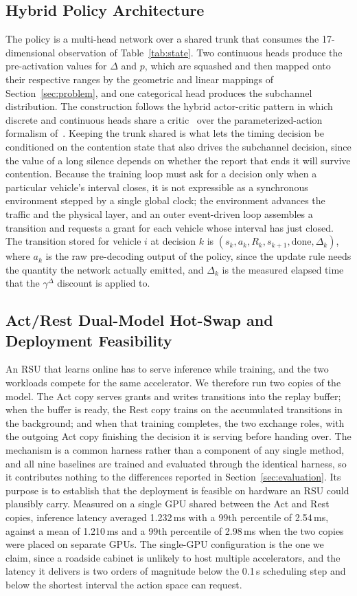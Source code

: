 \documentclass[journal]{IEEEtran}
\begin{document}
\subsection{Hybrid Policy Architecture}
The policy is a multi-head network over a shared trunk that consumes the 17-dimensional observation of Table~\ref{tab:state}. Two continuous heads produce the pre-activation values for $\Delta$ and $p$, which are squashed and then mapped onto their respective ranges by the geometric and linear mappings of Section~\ref{sec:problem}, and one categorical head produces the subchannel distribution. The construction follows the hybrid actor-critic pattern in which discrete and continuous heads share a critic~\cite{fan2019} over the parameterized-action formalism of~\cite{masson2016}. Keeping the trunk shared is what lets the timing decision be conditioned on the contention state that also drives the subchannel decision, since the value of a long silence depends on whether the report that ends it will survive contention. Because the training loop must ask for a decision only when a particular vehicle's interval closes, it is not expressible as a synchronous environment stepped by a single global clock; the environment advances the traffic and the physical layer, and an outer event-driven loop assembles a transition and requests a grant for each vehicle whose interval has just closed. The transition stored for vehicle $i$ at decision $k$ is $(s_k, a_k, R_k, s_{k+1}, \mathrm{done}, \Delta_k)$, where $a_k$ is the raw pre-decoding output of the policy, since the update rule needs the quantity the network actually emitted, and $\Delta_k$ is the measured elapsed time that the $\gamma^{\Delta}$ discount is applied to.

\subsection{Act/Rest Dual-Model Hot-Swap and Deployment Feasibility}
An RSU that learns online has to serve inference while training, and the two workloads compete for the same accelerator. We therefore run two copies of the model. The Act copy serves grants and writes transitions into the replay buffer; when the buffer is ready, the Rest copy trains on the accumulated transitions in the background; and when that training completes, the two exchange roles, with the outgoing Act copy finishing the decision it is serving before handing over. The mechanism is a common harness rather than a component of any single method, and all nine baselines are trained and evaluated through the identical harness, so it contributes nothing to the differences reported in Section~\ref{sec:evaluation}. Its purpose is to establish that the deployment is feasible on hardware an RSU could plausibly carry. Measured on a single GPU shared between the Act and Rest copies, inference latency averaged 1.232\,ms with a 99th percentile of 2.54\,ms, against a mean of 1.210\,ms and a 99th percentile of 2.98\,ms when the two copies were placed on separate GPUs. The single-GPU configuration is the one we claim, since a roadside cabinet is unlikely to host multiple accelerators, and the latency it delivers is two orders of magnitude below the 0.1\,s scheduling step and below the shortest interval the action space can request.
\end{document}
